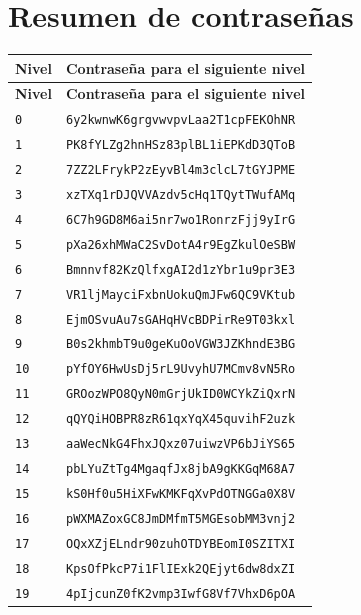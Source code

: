 \documentclass[11pt,a4paper]{article}
\begin{document}
\section*{Resumen de contraseñas}
\begin{longtable}{@{}ll@{}}
\toprule \textbf{Nivel} & \textbf{Contraseña para el siguiente nivel} \\
\midrule
\endfirsthead
\toprule \textbf{Nivel} & \textbf{Contraseña para el siguiente nivel} \\
\midrule
\endhead
\bottomrule
\endlastfoot
\texttt{0} & \texttt{6y2kwnwK6grgvwvpvLaa2T1cpFEKOhNR} \\
\texttt{1} & \texttt{PK8fYLZg2hnHSz83plBL1iEPKdD3QToB} \\
\texttt{2} & \texttt{7ZZ2LFrykP2zEyvBl4m3clcL7tGYJPME} \\
\texttt{3} & \texttt{xzTXq1rDJQVVAzdv5cHq1TQytTWufAMq} \\
\texttt{4} & \texttt{6C7h9GD8M6ai5nr7wo1RonrzFjj9yIrG} \\
\texttt{5} & \texttt{pXa26xhMWaC2SvDotA4r9EgZkulOeSBW} \\
\texttt{6} & \texttt{Bmnnvf82KzQlfxgAI2d1zYbr1u9pr3E3} \\
\texttt{7} & \texttt{VR1ljMayciFxbnUokuQmJFw6QC9VKtub} \\
\texttt{8} & \texttt{EjmOSvuAu7sGAHqHVcBDPirRe9T03kxl} \\
\texttt{9} & \texttt{B0s2khmbT9u0geKuOoVGW3JZKhndE3BG} \\
\texttt{10} & \texttt{pYfOY6HwUsDj5rL9UvyhU7MCmv8vN5Ro} \\
\texttt{11} & \texttt{GROozWPO8QyN0mGrjUkID0WCYkZiQxrN} \\
\texttt{12} & \texttt{qQYQiHOBPR8zR61qxYqX45quvihF2uzk} \\
\texttt{13} & \texttt{aaWecNkG4FhxJQxz07uiwzVP6bJiYS65} \\
\texttt{14} & \texttt{pbLYuZtTg4MgaqfJx8jbA9gKKGqM68A7} \\
\texttt{15} & \texttt{kS0Hf0u5HiXFwKMKFqXvPdOTNGGa0X8V} \\
\texttt{16} & \texttt{pWXMAZoxGC8JmDMfmT5MGEsobMM3vnj2} \\
\texttt{17} & \texttt{OQxXZjELndr90zuhOTDYBEomI0SZITXI} \\
\texttt{18} & \texttt{KpsOfPkcP7i1FlIExk2QEjyt6dw8dxZI} \\
\texttt{19} & \texttt{4pIjcunZ0fK2vmp3IwfG8Vf7VhxD6pOA} \\
\end{longtable}
\end{document}
